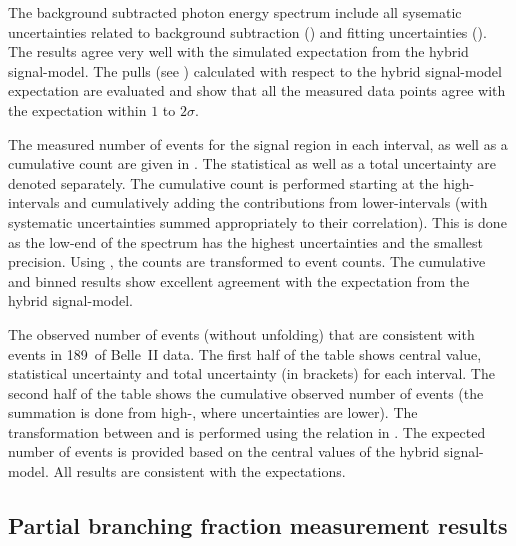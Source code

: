 The background subtracted photon energy spectrum include all sysematic uncertainties related 
to background subtraction ()
and fitting uncertainties ().
The results agree very well with the simulated expectation from the hybrid signal-model.
The pulls (see ) calculated with respect to the hybrid signal-model expectation are evaluated 
and show that all the measured data points agree with the expectation within $1$ to $2\sigma$.

The measured number of events for the signal region in each \EB interval, as well as a cumulative count are given in .
The statistical as well as a total uncertainty are denoted separately.
The cumulative count is performed starting at the high-\EB intervals and cumulatively adding the contributions from lower-\EB intervals (with systematic uncertainties summed appropriately to their correlation).
This is done as the low-end of the \EB spectrum has the highest uncertainties and the smallest precision.
Using , the \BtoXsdgamma counts are transformed to \BtoXsgamma event counts.
The cumulative and binned results show excellent agreement with the expectation from the hybrid signal-model.

\begin{table}
    \caption{\label{tab:observed_events}
    The observed number of events (without unfolding) that are consistent with \BtoXsdgamma events in 189~\invfb of Belle~II data.
    The first half of the table shows central value, statistical uncertainty and total uncertainty (in brackets) for each \EB interval.
    The second half of the table shows the cumulative observed number of events (the summation is done from high-\EB, where uncertainties are lower).
    The transformation between \BtoXsdgamma and \BtoXsgamma is performed using the relation in .
    The expected number of \BtoXsgamma events is provided based on the central values of the hybrid signal-model.
    All results are consistent with the expectations.
    }
    
\end{table}


\subsection{Partial branching fraction measurement results}\label{sec:partial_branching_fraction_results}


